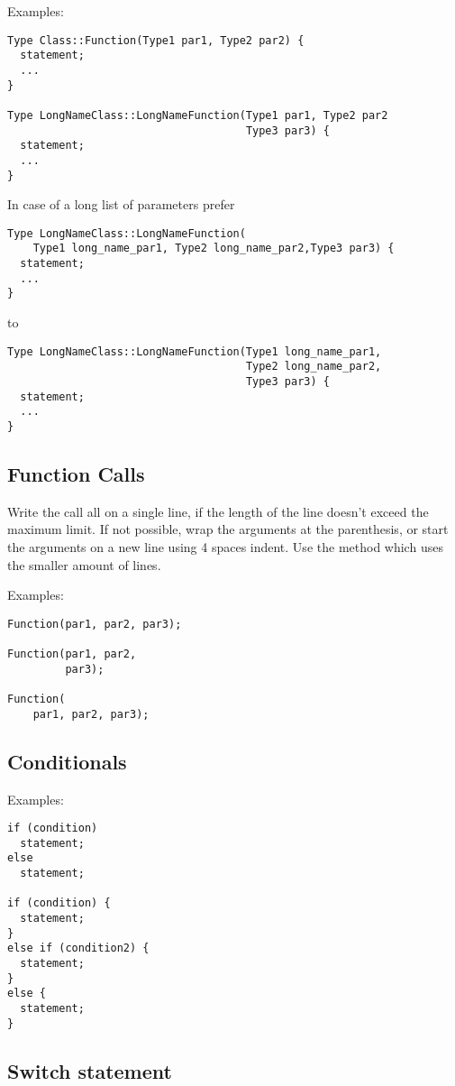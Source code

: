 \documentclass[a4paper]{article}
\begin{document}
Examples:
\begin{lstlisting}
Type Class::Function(Type1 par1, Type2 par2) {
  statement;
  ...
}

Type LongNameClass::LongNameFunction(Type1 par1, Type2 par2
                                     Type3 par3) {
  statement;
  ...
}
\end{lstlisting}

In case of a long list of parameters prefer
\begin{lstlisting}
Type LongNameClass::LongNameFunction(
    Type1 long_name_par1, Type2 long_name_par2,Type3 par3) {
  statement;
  ...
}
\end{lstlisting}
to
\begin{lstlisting}
Type LongNameClass::LongNameFunction(Type1 long_name_par1,
                                     Type2 long_name_par2,
                                     Type3 par3) {
  statement;
  ...
}
\end{lstlisting}

\subsection{Function Calls}

Write the call all on a single line, if the length of the line doesn't exceed the maximum limit.
If not possible, wrap the arguments at the parenthesis, or start the arguments on a new line using 4 spaces indent.
Use the method which uses the smaller amount of lines.

Examples:
\begin{lstlisting}
Function(par1, par2, par3);

Function(par1, par2,
         par3);

Function(
    par1, par2, par3);
\end{lstlisting}

\subsection{Conditionals}

Examples:
\begin{lstlisting}
if (condition)
  statement;
else  
  statement;
  
if (condition) {
  statement;
}
else if (condition2) {
  statement;
}
else {
  statement;
}
\end{lstlisting}

\subsection{Switch statement}
\end{document}
